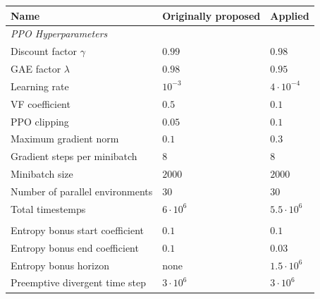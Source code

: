 \begin{table}[htbp]
  \small
  \centering
  \begin{tabular}{lll}
    \toprule
    \textbf{Name}                                & Originally proposed     & \textbf{Applied}         \\ \midrule
    \textit{PPO Hyperparameters}     &                                   &                                   \\ \midrule            
    Discount factor $\gamma$                     & $0.99$                            & $0.98$                            \\
    GAE factor $\lambda$                         & $0.98$                            & $0.95$                            \\
    Learning rate                                & $10^{-3}$                         & $4 \cdot 10^{-4}$                               \\
    VF coefficient                               & $0.5$                             & $0.1$                             \\
    PPO clipping                                 & $0.05$                            & $0.1$                             \\
    Maximum gradient norm                        & $0.1$                             & $0.3$                             \\
    Gradient steps per minibatch                 & $8$                               & $8$                               \\      
    Minibatch size                               & $2000$                            & $2000$                            \\
    Number of parallel environments              & $30$                              & $30$                              \\
    Total timestemps                             & $6\cdot10^6$                      & $5.5 \cdot 10^6$                  \\            \\
    Entropy bonus start coefficient              & $0.1$                             & $0.1$                             \\
    Entropy bonus end coefficient                & $0.1$                             & $0.03$                            \\
    Entropy bonus horizon                        & none                              & $1.5\cdot 10^6$                   \\
    Preemptive divergent time step               & $3\cdot 10^6$                     & $3\cdot 10^6$                     \\
    \midrule


\end{tabular}
\end{table}
